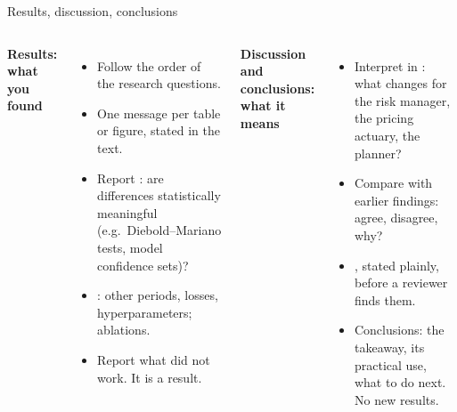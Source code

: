 \documentclass[aspectratio=169,11pt,t]{beamer}
\begin{document}
\begin{frame}{Results, discussion, conclusions}
  \begin{columns}[T,onlytextwidth]
    \textbf{Results: what you found}
    \begin{itemize}
      \item Follow the order of the research questions.
      \item One message per table or figure, stated in the text.
      \item Report : are differences statistically meaningful
            (e.g.\ Diebold--Mariano tests, model confidence sets)?
      \item {}: other periods, losses, hyperparameters; ablations.
      \item Report what did not work. It is a result.
    \end{itemize}
    \textbf{Discussion and conclusions: what it means}
    \begin{itemize}
      \item Interpret in : what changes for the risk manager, the pricing
            actuary, the planner?
      \item Compare with earlier findings: agree, disagree, why?
      \item {}, stated plainly, before a reviewer finds them.
      \item Conclusions: the takeaway, its practical use, what to do next. No new results.
    \end{itemize}
  \end{columns}
\end{frame}
\end{document}
